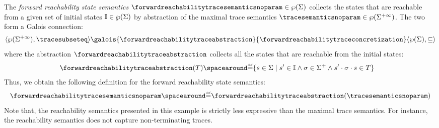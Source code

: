 \begin{example}
  The \emph{forward reachability state semantics} $\forwardreachabilitytracesemanticsnoparam\in\forwardreachabilitytracetype$ collects the states that are reachable from a given set of initial states $\mathbb{I}\in\wp(\Sigma)$ by abstraction of the maximal trace semantics $\tracesemanticsnoparam\in\tracetype$. The two form a Galois connection:
  \begin{align*}
    \tuple{\tracetype}{\tracesubseteq}\galois{\forwardreachabilitytraceabstraction}{\forwardreachabilitytraceconcretization}\tuple{\forwardreachabilitytracetype}{\forwardreachabilitytracesubseteq}
  \end{align*}
  where the abstraction $\forwardreachabilitytraceabstraction$ collects all the states that are reachable from the initial states:
  \begin{align*}
    \forwardreachabilitytraceabstraction(\defsetoftraces) &\DefeQ \setdef{\defstate\in\state}{ \defstate'\in\initialstates \land \deftrace\in\finitesequences \land \concat{\concat{\defstate'}{\deftrace}}{\defstate} \in \defsetoftraces}
  \end{align*}
Thus, we obtain the following definition for the forward reachability state semantics:
\[ \forwardreachabilitytracesemanticsnoparam \DefeQ \forwardreachabilitytraceabstraction(\tracesemanticsnoparam) \]
Note that, the reachability semantics presented in this example is strictly less expressive than the maximal trace semantics. For instance, the reachability semantics does not capture non-terminating traces.
\end{example}

